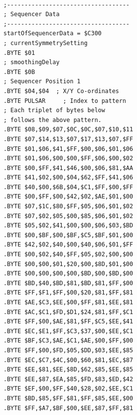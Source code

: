 \begin{minipage}[b]{0.33\linewidth}
\begin{lrbox}{\mybox}%
\begin{lstlisting}[basicstyle=\ttfamily\tiny]

;-----------------------------------
; Sequencer Data
;-----------------------------------
startOfSequencerData = $C300
; currentSymmetrySetting
.BYTE $01
; smoothingDelay
.BYTE $0B
; Sequencer Position 1
.BYTE $04,$04  ; X/Y Co-ordinates
.BYTE PULSAR     ; Index to pattern    
; Each triplet of bytes below
; follows the above pattern.
.BYTE $08,$09,$07,$0C,$0C,$07,$10,$11
.BYTE $07,$14,$13,$07,$17,$13,$07,$FF
.BYTE $01,$06,$41,$FF,$00,$06,$01,$06
.BYTE $01,$06,$00,$00,$FF,$06,$00,$02
.BYTE $00,$FF,$41,$46,$00,$06,$81,$AA
.BYTE $41,$02,$00,$04,$62,$FF,$41,$06
.BYTE $40,$00,$6B,$04,$C1,$FF,$00,$FF
.BYTE $00,$FF,$00,$42,$02,$AE,$01,$00
.BYTE $07,$1C,$80,$FF,$05,$06,$01,$02
.BYTE $07,$02,$05,$00,$85,$06,$01,$02
.BYTE $05,$02,$41,$00,$00,$06,$03,$BD
.BYTE $00,$BF,$00,$BF,$C5,$BF,$01,$00
.BYTE $42,$02,$40,$00,$40,$06,$01,$FF
.BYTE $00,$02,$40,$FF,$05,$02,$00,$00
.BYTE $00,$00,$01,$20,$00,$8D,$01,$00
.BYTE $00,$00,$00,$00,$BD,$00,$BD,$00
.BYTE $BD,$40,$BD,$81,$BD,$81,$FF,$00
.BYTE $FF,$F1,$FF,$00,$20,$81,$FF,$81
.BYTE $AE,$C3,$EE,$00,$FF,$81,$EE,$81
.BYTE $AC,$C1,$FD,$D1,$24,$81,$FF,$C1
.BYTE $FF,$00,$AE,$81,$FF,$C5,$EE,$41
.BYTE $EC,$E1,$FF,$C3,$37,$00,$EE,$C1
.BYTE $BF,$C3,$AE,$C1,$AE,$00,$FF,$00
.BYTE $FF,$00,$FD,$05,$DD,$03,$EE,$85
.BYTE $EC,$C7,$4C,$00,$60,$81,$EC,$87
.BYTE $EE,$81,$EE,$8D,$62,$85,$EE,$85
.BYTE $EE,$87,$EA,$85,$FD,$83,$ED,$42
.BYTE $EF,$00,$FF,$40,$28,$02,$EE,$C1
.BYTE $BD,$85,$FF,$81,$FF,$85,$EE,$00
.BYTE $FF,$A7,$BF,$00,$EE,$87,$FF,$81
\end{lstlisting}
\end{lrbox}%
\scalebox{0.8}{\usebox{\mybox}}
\end{minipage}
